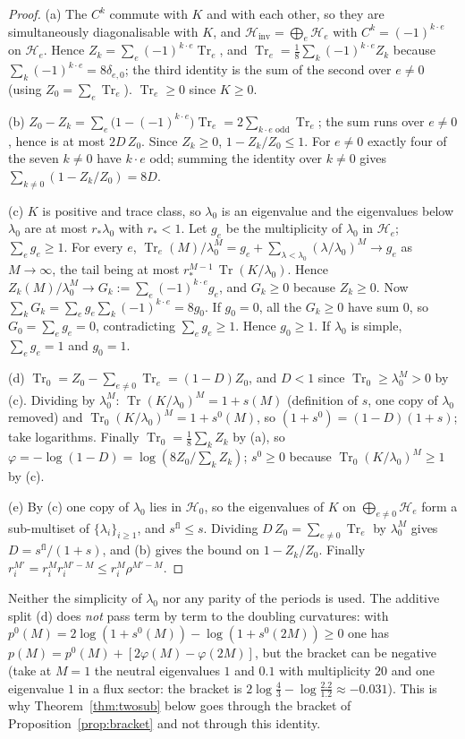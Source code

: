 \documentclass[11pt,a4paper]{article}
\theoremstyle{plain}
\theoremstyle{definition}
\theoremstyle{remark}
\numberwithin{equation}{section}
\newcommand{\Tr}{\operatorname{Tr}}
\newcommand{\Hinv}{\mathcal{H}_{\mathrm{inv}}}
\begin{document}
\begin{proof}
(a) The $C^k$ commute with $K$ and with each other, so they are simultaneously diagonalisable with $K$, and $\Hinv=\bigoplus_e\mathcal H_e$ with $C^k=(-1)^{k\cdot e}$ on $\mathcal H_e$. Hence $Z_k=\sum_e(-1)^{k\cdot e}\Tr_e$, and $\Tr_e=\frac18\sum_k(-1)^{k\cdot e}Z_k$ because $\sum_k(-1)^{k\cdot e}=8\delta_{e,0}$; the third identity is the sum of the second over $e\ne0$ (using $Z_0=\sum_e\Tr_e$). $\Tr_e\ge0$ since $K\ge0$.

(b) $Z_0-Z_k=\sum_e\bigl(1-(-1)^{k\cdot e}\bigr)\Tr_e=2\sum_{k\cdot e\text{ odd}}\Tr_e$; the sum runs over $e\ne0$, hence is at most $2D\,Z_0$. Since $Z_k\ge0$, $1-Z_k/Z_0\le1$. For $e\ne0$ exactly four of the seven $k\ne0$ have $k\cdot e$ odd; summing the identity over $k\ne0$ gives $\sum_{k\ne0}(1-Z_k/Z_0)=8D$.

(c) $K$ is positive and trace class, so $\lambda_0$ is an eigenvalue and the eigenvalues below $\lambda_0$ are at most $r_*\lambda_0$ with $r_*<1$. Let $g_e$ be the multiplicity of $\lambda_0$ in $\mathcal H_e$; $\sum_eg_e\ge1$. For every $e$, $\Tr_e(M)/\lambda_0^M=g_e+\sum_{\lambda<\lambda_0}(\lambda/\lambda_0)^M\to g_e$ as $M\to\infty$, the tail being at most $r_*^{M-1}\,\Tr(K/\lambda_0)$. Hence $Z_k(M)/\lambda_0^M\to G_k:=\sum_e(-1)^{k\cdot e}g_e$, and $G_k\ge0$ because $Z_k\ge0$. Now $\sum_kG_k=\sum_eg_e\sum_k(-1)^{k\cdot e}=8g_0$. If $g_0=0$, all the $G_k\ge0$ have sum $0$, so $G_0=\sum_eg_e=0$, contradicting $\sum_eg_e\ge1$. Hence $g_0\ge1$. If $\lambda_0$ is simple, $\sum_eg_e=1$ and $g_0=1$.

(d) $\Tr_0=Z_0-\sum_{e\ne0}\Tr_e=(1-D)Z_0$, and $D<1$ since $\Tr_0\ge\lambda_0^M>0$ by (c). Dividing by $\lambda_0^M$: $\Tr(K/\lambda_0)^M=1+s(M)$ (definition of $s$, one copy of $\lambda_0$ removed) and $\Tr_0(K/\lambda_0)^M=1+s^0(M)$, so $(1+s^0)=(1-D)(1+s)$; take logarithms. Finally $\Tr_0=\frac18\sum_kZ_k$ by (a), so $\varphi=-\log(1-D)=\log(8Z_0/\sum_kZ_k)$; $s^0\ge0$ because $\Tr_0(K/\lambda_0)^M\ge1$ by (c).

(e) By (c) one copy of $\lambda_0$ lies in $\mathcal H_0$, so the eigenvalues of $K$ on $\bigoplus_{e\ne0}\mathcal H_e$ form a sub-multiset of $\{\lambda_i\}_{i\ge1}$, and $s^{\mathrm{fl}}\le s$. Dividing $D\,Z_0=\sum_{e\ne0}\Tr_e$ by $\lambda_0^M$ gives $D=s^{\mathrm{fl}}/(1+s)$, and (b) gives the bound on $1-Z_k/Z_0$. Finally $r_i^{M'}=r_i^Mr_i^{M'-M}\le r_i^M\rho^{M'-M}$.
\end{proof}
Neither the simplicity of $\lambda_0$ nor any parity of the periods is used. The additive split (d) does \emph{not} pass term by term to the doubling curvatures: with $p^0(M)=2\log(1+s^0(M))-\log(1+s^0(2M))\ge0$ one has $p(M)=p^0(M)+[2\varphi(M)-\varphi(2M)]$, but the bracket can be negative (take at $M=1$ the neutral eigenvalues $1$ and $0.1$ with multiplicity $20$ and one eigenvalue $1$ in a flux sector: the bracket is $2\log\frac43-\log\frac{2.2}{1.2}\approx-0.031$). This is why Theorem~\ref{thm:twosub} below goes through the bracket of Proposition~\ref{prop:bracket} and not through this identity.
\end{document}
